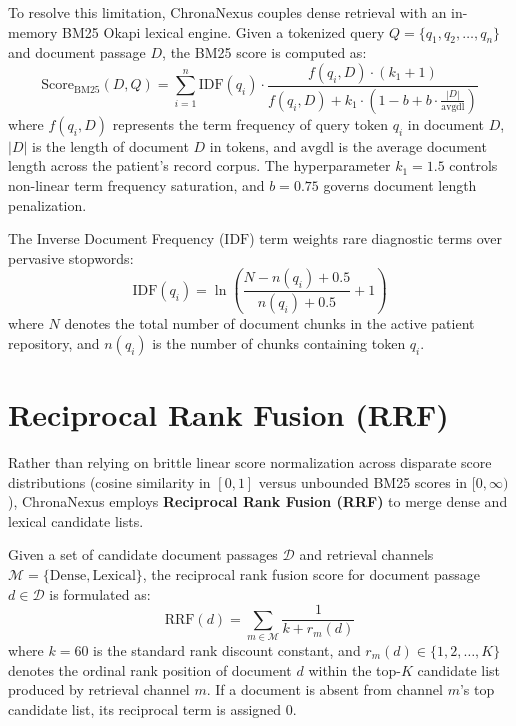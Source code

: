 To resolve this limitation, ChronaNexus couples dense retrieval with an in-memory BM25 Okapi lexical engine. Given a tokenized query $Q = \{q_1, q_2, \dots, q_n\}$ and document passage $D$, the BM25 score is computed as:
\begin{equation}
\text{Score}_{\text{BM25}}(D, Q) = \sum_{i=1}^{n} \text{IDF}(q_i) \cdot \frac{f(q_i, D) \cdot (k_1 + 1)}{f(q_i, D) + k_1 \cdot \left(1 - b + b \cdot \frac{|D|}{\text{avgdl}}\right)}
\end{equation}
where $f(q_i, D)$ represents the term frequency of query token $q_i$ in document $D$, $|D|$ is the length of document $D$ in tokens, and $\text{avgdl}$ is the average document length across the patient's record corpus. The hyperparameter $k_1 = 1.5$ controls non-linear term frequency saturation, and $b = 0.75$ governs document length penalization.

The Inverse Document Frequency ($\text{IDF}$) term weights rare diagnostic terms over pervasive stopwords:
\begin{equation}
\text{IDF}(q_i) = \ln\left( \frac{N - n(q_i) + 0.5}{n(q_i) + 0.5} + 1 \right)
\end{equation}
where $N$ denotes the total number of document chunks in the active patient repository, and $n(q_i)$ is the number of chunks containing token $q_i$.

\section{Reciprocal Rank Fusion (RRF)}
\label{sec:rrf_fusion}

Rather than relying on brittle linear score normalization across disparate score distributions (cosine similarity in $[0, 1]$ versus unbounded BM25 scores in $[0, \infty)$), ChronaNexus employs \textbf{Reciprocal Rank Fusion (RRF)} \cite{cormack2009rrf,lin2023hybrid} to merge dense and lexical candidate lists.

Given a set of candidate document passages $\mathcal{D}$ and retrieval channels $\mathcal{M} = \{\text{Dense}, \text{Lexical}\}$, the reciprocal rank fusion score for document passage $d \in \mathcal{D}$ is formulated as:
\begin{equation}
\text{RRF}(d) = \sum_{m \in \mathcal{M}} \frac{1}{k + r_m(d)}
\end{equation}
where $k = 60$ is the standard rank discount constant, and $r_m(d) \in \{1, 2, \dots, K\}$ denotes the ordinal rank position of document $d$ within the top-$K$ candidate list produced by retrieval channel $m$. If a document is absent from channel $m$'s top candidate list, its reciprocal term is assigned $0$.

